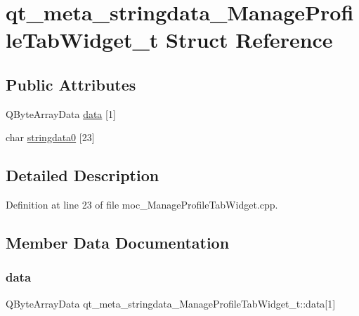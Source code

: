 \hypertarget{structqt__meta__stringdata___manage_profile_tab_widget__t}{}\section{qt\+\_\+meta\+\_\+stringdata\+\_\+\+Manage\+Profile\+Tab\+Widget\+\_\+t Struct Reference}
\label{structqt__meta__stringdata___manage_profile_tab_widget__t}
\subsection*{Public Attributes}
\begin{DoxyCompactItemize}
\item 
Q\+Byte\+Array\+Data \hyperlink{structqt__meta__stringdata___manage_profile_tab_widget__t_a151c85c135da7bd511b587366d75d579}{data} \mbox{[}1\mbox{]}
\item 
char \hyperlink{structqt__meta__stringdata___manage_profile_tab_widget__t_a3a09b5b1788477180e8e12d9c1f50d27}{stringdata0} \mbox{[}23\mbox{]}
\end{DoxyCompactItemize}


\subsection{Detailed Description}


Definition at line 23 of file moc\+\_\+\+Manage\+Profile\+Tab\+Widget.\+cpp.



\subsection{Member Data Documentation}
\mbox{\label{structqt__meta__stringdata___manage_profile_tab_widget__t_a151c85c135da7bd511b587366d75d579}} 
\subsubsection{\texorpdfstring{data}{data}}
{\footnotesize\ttfamily Q\+Byte\+Array\+Data qt\+\_\+meta\+\_\+stringdata\+\_\+\+Manage\+Profile\+Tab\+Widget\+\_\+t\+::data\mbox{[}1\mbox{]}}



